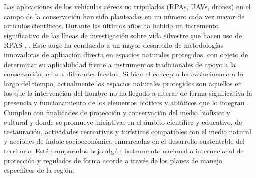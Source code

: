 \documentclass[9t,twocolumn]{article}
\begin{document}
Las aplicaciones de los vehículos aéreos no tripulados (RPAs, UAVs,
drones) en el campo de la conservación han sido planteadas en un número
cada vez mayor de artículos científicos. Durante los últimos años ha
habido un incremento significativo de las líneas de investigación sobre
vida silvestre que hacen uso de RPAS \citep{Linchant2015},
\citep{Christie2016}. Este auge ha conducido a un mayor desarrollo de
metodologías innovadoras de aplicación directa en espacios naturales
protegidos, con objeto de determinar su aplicabilidad frente a
instrumentos tradicionales de apoyo a la conservación, en sus diferentes
facetas. Si bien el concepto ha evolucionado a lo largo del tiempo,
actualmente los espacios naturales protegidos son aquellos en los que la
intervención del hombre no ha llegado a alterar de forma significativa
la presencia y funcionamiento de los elementos bióticos y abióticos que
lo integran \citep{Bravo2008}. Cumplen con finalidades de protección y
conservación del medio biofísico y cultural y donde se promueve
iniciativas en el ámbito científico y educativo, de restauración,
actividades recreativas y turísticas compatibles con el medio natural y
acciones de índole socioeconómica enmarcadas en el desarrollo
sustentable del territorio. Están amparados bajo algún instrumento
nacional o internacional de protección y regulados de forma acorde a
través de los planes de manejo específicos de la región.
\end{document}
